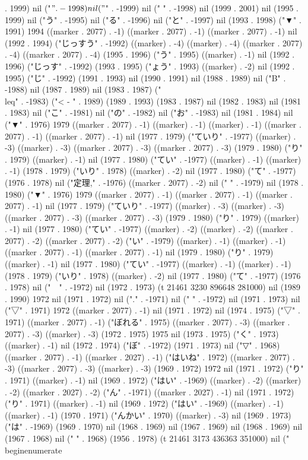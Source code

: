 . 1999) nil ("$" . -1998) nil ("$" . -1999) nil (" " . -1998) nil (1999 . 2001) nil (1995 . 1999) nil ("う" . -1995) nil ("る" . -1996) nil ("と" . -1997) nil (1993 . 1998) ("▼" . 1991) 1994 ((marker . 2077) . -1) ((marker . 2077) . -1) ((marker . 2077) . -1) nil (1992 . 1994) ("じっすう" . -1992) ((marker) . -4) ((marker) . -4) ((marker . 2077) . -4) ((marker . 2077) . -4) (1995 . 1996) ("う" . 1995) ((marker) . -1) nil (1992 . 1996) ("じっす" . -1992) (1993 . 1995) ("ょう" . 1993) ((marker) . -2) nil (1992 . 1995) ("じ" . -1992) (1991 . 1993) nil (1990 . 1991) nil (1988 . 1989) nil ("B" . -1988) nil (1987 . 1989) nil (1983 . 1987) ("\\leq" . -1983) ("<
-
" . 1989) (1989 . 1993) (1983 . 1987) nil (1982 . 1983) nil (1981 . 1983) nil ("こ" . -1981) nil ("の" . -1982) nil ("お" . -1983) nil (1981 . 1984) nil ("▼" . 1976) 1979 ((marker . 2077) . -1) ((marker) . -1) ((marker) . -1) ((marker . 2077) . -1) ((marker . 2077) . -1) nil (1977 . 1979) ("ていり" . -1977) ((marker) . -3) ((marker) . -3) ((marker . 2077) . -3) ((marker . 2077) . -3) (1979 . 1980) ("り" . 1979) ((marker) . -1) nil (1977 . 1980) ("てい" . -1977) ((marker) . -1) ((marker) . -1) (1978 . 1979) ("いり" . 1978) ((marker) . -2) nil (1977 . 1980) ("て" . -1977) (1976 . 1978) nil ("定理," . -1976) ((marker . 2077) . -2) nil (" " . -1979) nil (1978 . 1980) ("▼" . 1976) 1979 ((marker . 2077) . -1) ((marker . 2077) . -1) ((marker . 2077) . -1) nil (1977 . 1979) ("ていり" . -1977) ((marker) . -3) ((marker) . -3) ((marker . 2077) . -3) ((marker . 2077) . -3) (1979 . 1980) ("り" . 1979) ((marker) . -1) nil (1977 . 1980) ("てい" . -1977) ((marker) . -2) ((marker) . -2) ((marker . 2077) . -2) ((marker . 2077) . -2) ("い" . -1979) ((marker) . -1) ((marker) . -1) ((marker . 2077) . -1) ((marker . 2077) . -1) nil (1979 . 1980) ("り" . 1979) ((marker) . -1) nil (1977 . 1980) ("てい" . -1977) ((marker) . -1) ((marker) . -1) (1978 . 1979) ("いり" . 1978) ((marker) . -2) nil (1977 . 1980) ("て" . -1977) (1976 . 1978) nil ("　" . -1972) nil (1972 . 1973) (t 21461 3230 896648 281000) nil (1989 . 1990) 1972 nil (1971 . 1972) nil ("." . -1971) nil (" " . -1972) nil (1971 . 1973) nil ("▽" . 1971) 1972 ((marker . 2077) . -1) nil (1971 . 1972) nil (1974 . 1975) ("▽" . 1971) ((marker . 2077) . -1) ("ぼれる" . 1975) ((marker . 2077) . -3) ((marker . 2077) . -3) ((marker) . -3) (1972 . 1975) 1975 nil (1973 . 1975) ("く" . 1973) ((marker) . -1) nil (1972 . 1974) ("ぼ" . -1972) (1971 . 1973) nil ("▽" . 1968) ((marker . 2077) . -1) ((marker . 2027) . -1) ("はいね" . 1972) ((marker . 2077) . -3) ((marker . 2077) . -3) ((marker) . -3) (1969 . 1972) 1972 nil (1971 . 1972) ("り" . 1971) ((marker) . -1) nil (1969 . 1972) ("はい" . -1969) ((marker) . -2) ((marker) . -2) ((marker . 2027) . -2) ("ん" . -1971) ((marker . 2027) . -1) nil (1971 . 1972) ("り" . 1971) ((marker) . -1) nil (1969 . 1972) ("はい" . -1969) ((marker) . -1) ((marker) . -1) (1970 . 1971) ("んかい" . 1970) ((marker) . -3) nil (1969 . 1973) ("は" . -1969) (1969 . 1970) nil (1968 . 1969) nil (1967 . 1969) nil (1968 . 1969) nil (1967 . 1968) nil (" " . 1968) (1956 . 1978) (t 21461 3173 436363 351000) nil ("\\begin{enumerate}
